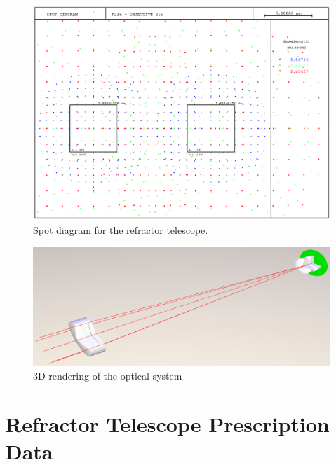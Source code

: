 \begin{figure}[htpb]
    \centering
    \includegraphics[width=\linewidth]{img/eps/objective_spot_diagram.eps}
    \caption{Spot diagram for the refractor telescope.}%
    \label{fig:refractor_spot_diagram}
\end{figure}

\begin{figure}[htpb]
    \centering
    \includegraphics[width=\linewidth]{img/png/objective_render.png}
    \caption{3D rendering of the optical system}%
    \label{fig:3d_rendering_refractor}
\end{figure}

\FloatBarrier
\section*{Refractor Telescope Prescription Data}%
\label{sec:refractor_telescope_prescription_data}
